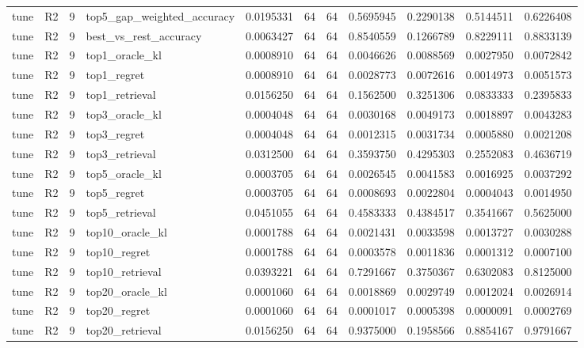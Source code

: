 \begin{tabular}{llrlrrrrrrr}
tune & R2 & 9 & top5_gap_weighted_accuracy & 0.0195331 & 64 & 64 & 0.5695945 & 0.2290138 & 0.5144511 & 0.6226408 \\
tune & R2 & 9 & best_vs_rest_accuracy & 0.0063427 & 64 & 64 & 0.8540559 & 0.1266789 & 0.8229111 & 0.8833139 \\
tune & R2 & 9 & top1_oracle_kl & 0.0008910 & 64 & 64 & 0.0046626 & 0.0088569 & 0.0027950 & 0.0072842 \\
tune & R2 & 9 & top1_regret & 0.0008910 & 64 & 64 & 0.0028773 & 0.0072616 & 0.0014973 & 0.0051573 \\
tune & R2 & 9 & top1_retrieval & 0.0156250 & 64 & 64 & 0.1562500 & 0.3251306 & 0.0833333 & 0.2395833 \\
tune & R2 & 9 & top3_oracle_kl & 0.0004048 & 64 & 64 & 0.0030168 & 0.0049173 & 0.0018897 & 0.0043283 \\
tune & R2 & 9 & top3_regret & 0.0004048 & 64 & 64 & 0.0012315 & 0.0031734 & 0.0005880 & 0.0021208 \\
tune & R2 & 9 & top3_retrieval & 0.0312500 & 64 & 64 & 0.3593750 & 0.4295303 & 0.2552083 & 0.4636719 \\
tune & R2 & 9 & top5_oracle_kl & 0.0003705 & 64 & 64 & 0.0026545 & 0.0041583 & 0.0016925 & 0.0037292 \\
tune & R2 & 9 & top5_regret & 0.0003705 & 64 & 64 & 0.0008693 & 0.0022804 & 0.0004043 & 0.0014950 \\
tune & R2 & 9 & top5_retrieval & 0.0451055 & 64 & 64 & 0.4583333 & 0.4384517 & 0.3541667 & 0.5625000 \\
tune & R2 & 9 & top10_oracle_kl & 0.0001788 & 64 & 64 & 0.0021431 & 0.0033598 & 0.0013727 & 0.0030288 \\
tune & R2 & 9 & top10_regret & 0.0001788 & 64 & 64 & 0.0003578 & 0.0011836 & 0.0001312 & 0.0007100 \\
tune & R2 & 9 & top10_retrieval & 0.0393221 & 64 & 64 & 0.7291667 & 0.3750367 & 0.6302083 & 0.8125000 \\
tune & R2 & 9 & top20_oracle_kl & 0.0001060 & 64 & 64 & 0.0018869 & 0.0029749 & 0.0012024 & 0.0026914 \\
tune & R2 & 9 & top20_regret & 0.0001060 & 64 & 64 & 0.0001017 & 0.0005398 & 0.0000091 & 0.0002769 \\
tune & R2 & 9 & top20_retrieval & 0.0156250 & 64 & 64 & 0.9375000 & 0.1958566 & 0.8854167 & 0.9791667 \\
\bottomrule
\end{tabular}
